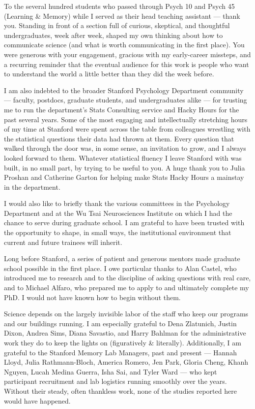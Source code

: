 To the several hundred students who passed through Psych 10 and Psych 45 (Learning \& Memory) while I served as their head teaching assistant --- thank you. Standing in front of a section full of curious, skeptical, and thoughtful undergraduates, week after week, shaped my own thinking about how to communicate science (and what is worth communicating in the first place). You were generous with your engagement, gracious with my early-career missteps, and a recurring reminder that the eventual audience for this work is people who want to understand the world a little better than they did the week before.

I am also indebted to the broader Stanford Psychology Department community --- faculty, postdocs, graduate students, and undergraduates alike --- for trusting me to run the department's Stats Consulting service and Hacky Hours for the past several years. Some of the most engaging and intellectually stretching hours of my time at Stanford were spent across the table from colleagues wrestling with the statistical questions their data had thrown at them. Every question that walked through the door was, in some sense, an invitation to grow, and I always looked forward to them. Whatever statistical fluency I leave Stanford with was built, in no small part, by trying to be useful to you. A huge thank you to Julia Proshan and Catherine Garton for helping make Stats Hacky Hours a mainstay in the department.

I would also like to briefly thank the various committees in the Psychology Department and at the Wu Tsai Neurosciences Institute on which I had the chance to serve during graduate school. I am grateful to have been trusted with the opportunity to shape, in small ways, the institutional environment that current and future trainees will inherit.

Long before Stanford, a series of patient and generous mentors made graduate school possible in the first place. I owe particular thanks to Alan Castel, who introduced me to research and to the discipline of asking questions with real care, and to Michael Alfaro, who prepared me to apply to and ultimately complete my PhD. I would not have known how to begin without them.

Science depends on the largely invisible labor of the staff who keep our programs and our buildings running. I am especially grateful to Dena Zlatunich, Justin Dixon, Andrea Sims, Diana Savastio, and Harry Bahlman for the administrative work they do to keep the lights on (figuratively \& literally). Additionally, I am grateful to the Stanford Memory Lab Managers, past and present --- Hannah Lloyd, Julia Rathmann-Bloch, America Romero, Jen Park, Gloria Cheng, Khanh Nguyen, Lucah Medina Guerra, Isha Sai, and Tyler Ward --- who kept participant recruitment and lab logistics running smoothly over the years. Without their steady, often thankless work, none of the studies reported here would have happened.

